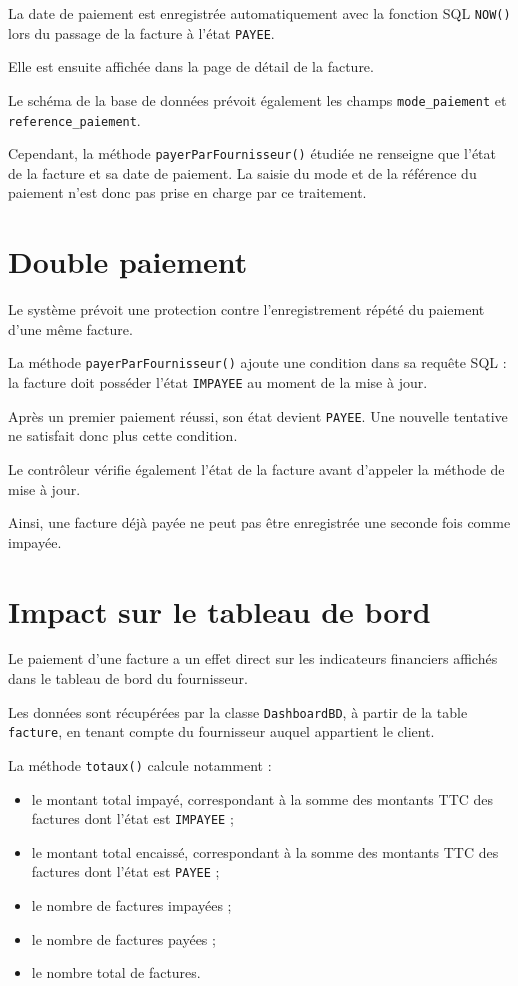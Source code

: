 La date de paiement est enregistrée automatiquement avec la fonction SQL \texttt{NOW()} lors du passage de la facture à l'état \texttt{PAYEE}.

Elle est ensuite affichée dans la page de détail de la facture.

Le schéma de la base de données prévoit également les champs \texttt{mode\_paiement} et \texttt{reference\_paiement}.

Cependant, la méthode \texttt{payerParFournisseur()} étudiée ne renseigne que l'état de la facture et sa date de paiement. La saisie du mode et de la référence du paiement n'est donc pas prise en charge par ce traitement.

\section{Double paiement}

Le système prévoit une protection contre l'enregistrement répété du paiement d'une même facture.

La méthode \texttt{payerParFournisseur()} ajoute une condition dans sa requête SQL : la facture doit posséder l'état \texttt{IMPAYEE} au moment de la mise à jour.

Après un premier paiement réussi, son état devient \texttt{PAYEE}. Une nouvelle tentative ne satisfait donc plus cette condition.

Le contrôleur vérifie également l'état de la facture avant d'appeler la méthode de mise à jour.

Ainsi, une facture déjà payée ne peut pas être enregistrée une seconde fois comme impayée.

\section{Impact sur le tableau de bord}

Le paiement d'une facture a un effet direct sur les indicateurs financiers affichés dans le tableau de bord du fournisseur.

Les données sont récupérées par la classe \texttt{DashboardBD}, à partir de la table \texttt{facture}, en tenant compte du fournisseur auquel appartient le client.

La méthode \texttt{totaux()} calcule notamment :
\begin{itemize}
    \item le montant total impayé, correspondant à la somme des montants TTC des factures dont l'état est \texttt{IMPAYEE} ;
    \item le montant total encaissé, correspondant à la somme des montants TTC des factures dont l'état est \texttt{PAYEE} ;
    \item le nombre de factures impayées ;
    \item le nombre de factures payées ;
    \item le nombre total de factures.
\end{itemize}

